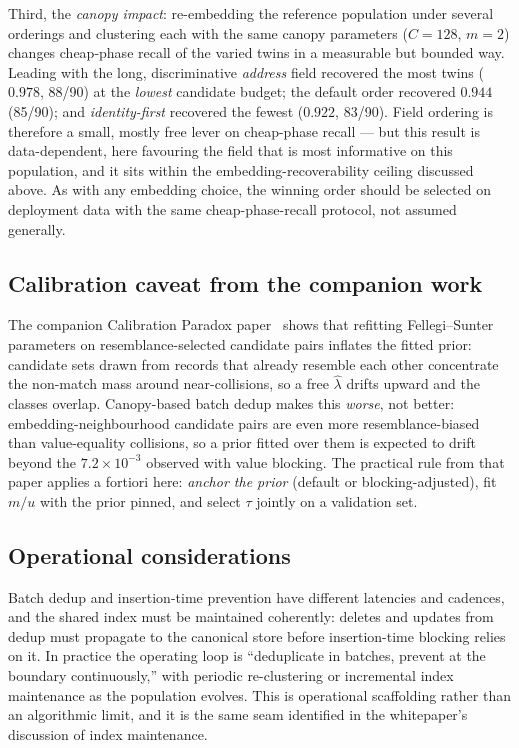 \documentclass[11pt]{article}
\begin{document}
Third, the \emph{canopy impact}: re-embedding the reference population under several orderings
and clustering each with the same canopy parameters ($C=128$, $m=2$) changes cheap-phase recall
of the varied twins in a measurable but bounded way. Leading with the long, discriminative
\emph{address} field recovered the most twins ($0.978$, 88/90) at the \emph{lowest} candidate
budget; the default order recovered $0.944$ (85/90); and \emph{identity-first} recovered the
fewest ($0.922$, 83/90). Field ordering is therefore a small, mostly free lever on cheap-phase
recall --- but this result is data-dependent, here favouring the field that is most informative
on this population, and it sits within the embedding-recoverability ceiling discussed above.
As with any embedding choice, the winning order should be selected on deployment data with the
same cheap-phase-recall protocol, not assumed generally.

\subsection{Calibration caveat from the companion work}
The companion Calibration Paradox paper~\cite{paradox} shows that refitting Fellegi--Sunter
parameters on resemblance-selected candidate pairs inflates the fitted prior: candidate sets
drawn from records that already resemble each other concentrate the non-match mass around
near-collisions, so a free $\hat\lambda$ drifts upward and the classes overlap. Canopy-based
batch dedup makes this \emph{worse}, not better: embedding-neighbourhood candidate pairs are
even more resemblance-biased than value-equality collisions, so a prior fitted over them is
expected to drift beyond the $7.2\times10^{-3}$ observed with value blocking. The practical
rule from that paper applies a fortiori here: \emph{anchor the prior} (default or
blocking-adjusted), fit $m/u$ with the prior pinned, and select $\tau$ jointly on a
validation set.

\subsection{Operational considerations}
Batch dedup and insertion-time prevention have different latencies and cadences, and the
shared index must be maintained coherently: deletes and updates from dedup must propagate to
the canonical store before insertion-time blocking relies on it. In practice the operating
loop is ``deduplicate in batches, prevent at the boundary continuously,'' with periodic
re-clustering or incremental index maintenance as the population evolves. This is operational
scaffolding rather than an algorithmic limit, and it is the same seam identified in the
whitepaper's discussion of index maintenance.
\end{document}
